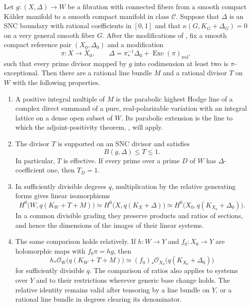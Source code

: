 \begin{proposition}\label{rankone:comparison}
Let $g:(X,\Delta)\to W$ be a fibration with connected fibers from a
smooth compact K\"ahler manifold to a smooth compact manifold in
class $\mathcal C$.  Suppose that $\Delta$ is an SNC boundary with
rational coefficients in $[0,1]$ and that
$\kappa(G,K_G+\Delta_G)=0$ on a very general smooth fiber $G$.
After the modifications of
, fix a smooth compact
reference pair $(X_0,\Delta_0)$ and a modification
\[
 \pi:X\longrightarrow X_0,\qquad
 \Delta=\pi_*^{-1}\Delta_0+\operatorname{Exc}(\pi)_{\mathrm{red}},
\]
such that every prime divisor mapped by $g$ into codimension at least two
is $\pi$-exceptional.  Then there are a rational line bundle $M$
and a rational divisor $T$ on $W$ with the following properties.
\begin{enumerate}[label=\textup{(\roman*)}]
\item A positive integral multiple of $M$ is the parabolic highest Hodge
line of a complex direct summand of a pure, real-polarizable variation
with an integral lattice on a dense open subset of $W$.  Its parabolic extension is the line to which the adjoint-positivity
theorem, , will apply.
\item The divisor $T$ is supported on an SNC divisor and satisfies
\begin{equation}\label{rankone:boundary}
 B(g,\Delta)\leq T\leq 1.
\end{equation}
In particular, $T$ is effective.  If every prime over a prime $D$ of $W$
has $\Delta$-coefficient one, then $T_D=1$.
\item In sufficiently divisible degrees $q$, multiplication by the
relative generating forms gives linear isomorphisms
\begin{equation}\label{rankone:sections}
 H^0\bigl(W,q(K_W+T+M)\bigr)
 \simeq H^0\bigl(X,q(K_X+\Delta)\bigr)
 \simeq H^0\bigl(X_0,q(K_{X_0}+\Delta_0)\bigr).
\end{equation}
In a common divisible grading they preserve products and ratios of
sections, and hence the dimensions
of the images of their linear systems.
\item The same comparison holds relatively.  If $h:W\to Y$ and
$f_0:X_0\to Y$ are holomorphic maps with $f_0\pi=hg$, then
\begin{equation}\label{rankone:relative-sections}
 h_*\mathcal O_W\bigl(q(K_W+T+M)\bigr)
 \simeq (f_0)_*\mathcal O_{X_0}\bigl(q(K_{X_0}+\Delta_0)\bigr)
\end{equation}
for sufficiently divisible $q$.  The comparison of ratios also applies
to systems over $Y$ and to their restrictions wherever generic base
change holds. The relative identity remains valid after tensoring by a
line bundle on $Y$, or a rational line bundle in degrees clearing its
denominator.
\end{enumerate}
\end{proposition}

